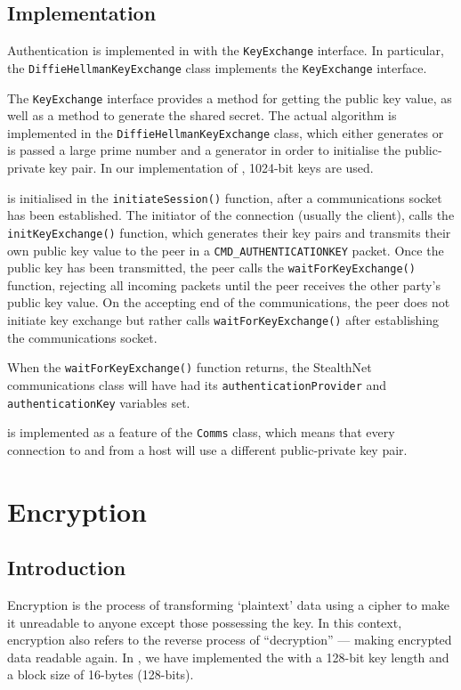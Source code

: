\documentclass[a4paper,11pt]{article}
\begin{document}
\subsection{Implementation}
Authentication is implemented in \packageName{} with the
\verb+KeyExchange+ interface. In particular, the \verb+DiffieHellmanKeyExchange+
class implements the \verb+KeyExchange+ interface.

The \verb+KeyExchange+ interface provides a method for getting the public key
value, as well as a method to generate the shared secret. The actual
 algorithm is implemented in the
\verb+DiffieHellmanKeyExchange+ class, which either generates or is passed a
large prime number and a generator in order to initialise the
 public-private key pair. In our implementation of
, 1024-bit keys are used.

 is initialised in the
\verb+initiateSession()+ function, after a communications socket has been
established. The initiator of the connection (usually the client), calls the
\verb+initKeyExchange()+ function, which generates their
 key pairs and transmits their own public key value to
the peer in a \verb+CMD_AUTHENTICATIONKEY+ packet. Once the public key has been
transmitted, the \serviceName{} peer calls the \verb+waitForKeyExchange()+
function, rejecting all incoming packets until the peer receives the other
party's public key value. On the accepting end of the communications, the peer
does not initiate key exchange but rather calls \verb+waitForKeyExchange()+
after establishing the communications socket.

When the \verb+waitForKeyExchange()+ function returns, the StealthNet
communications class will have had its \verb+authenticationProvider+ and \\
\verb+authenticationKey+ variables set.

 is implemented as a feature of the
\serviceName{} \verb+Comms+ class, which means that every connection to and from
a host will use a different public-private key pair.

\section{Encryption}

\subsection{Introduction}
Encryption is the process of transforming `plaintext' data using a cipher to
make it unreadable to anyone except those possessing the key. In this context,
encryption also refers to the reverse process of ``decryption'' --- making
encrypted data readable again. In \packageName{}, we have implemented the
 with a 128-bit key length and a
block size of 16-bytes (128-bits).
\end{document}
